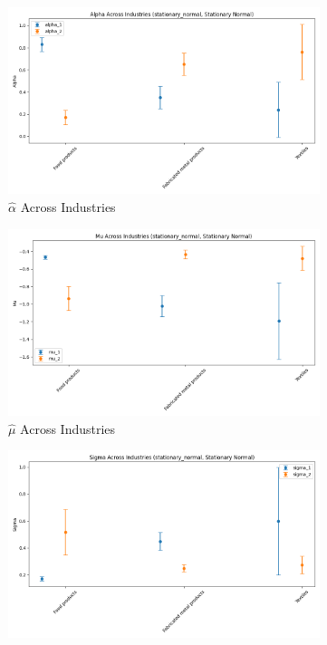 \documentclass{article}
\begin{document}
\begin{figure}[ht!]
    \centering 
    \caption{Stationary Normal Model Across Industries}
    \begin{subfigure}[t]{0.32\textwidth}
        \centering
        \includegraphics[width=\textwidth]{figure/stationary_normal_alpha_across_industries.png}
        \caption{$\hat\alpha$ Across Industries}
    \end{subfigure}
    \begin{subfigure}[t]{0.32\textwidth}
        \centering
        \includegraphics[width=\textwidth]{figure/stationary_normal_mu_across_industries.png}
        \caption{$\hat\mu$ Across Industries}
    \end{subfigure}
    \begin{subfigure}[t]{0.32\textwidth}
        \centering
        \includegraphics[width=\textwidth]{figure/stationary_normal_sigma_across_industries.png}

\end{subfigure}
\end{figure}
\end{document}
